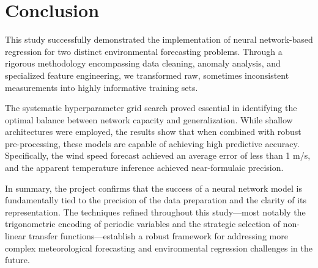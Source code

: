 \documentclass[conference]{IEEEtran}
\begin{document}
\section{Conclusion}
This study successfully demonstrated the implementation of neural network-based regression for two distinct environmental forecasting problems. Through a rigorous methodology encompassing data cleaning, anomaly analysis, and specialized feature engineering, we transformed raw, sometimes inconsistent measurements into highly informative training sets.

The systematic hyperparameter grid search proved essential in identifying the optimal balance between network capacity and generalization. While shallow architectures were employed, the results show that when combined with robust pre-processing, these models are capable of achieving high predictive accuracy. Specifically, the wind speed forecast achieved an average error of less than 1 m/s, and the apparent temperature inference achieved near-formulaic precision.

In summary, the project confirms that the success of a neural network model is fundamentally tied to the precision of the data preparation and the clarity of its representation. The techniques refined throughout this study—most notably the trigonometric encoding of periodic variables and the strategic selection of non-linear transfer functions—establish a robust framework for addressing more complex meteorological forecasting and environmental regression challenges in the future.



\onecolumn
\appendix


\begin{lstlisting}[language=Matlab, caption={windspeed\_data\_cleaning.m}, captionpos=t]

\end{lstlisting}


\begin{lstlisting}[language=Matlab, caption={windspeed\_data\_visualization.m}, captionpos=t]

\end{lstlisting}


\begin{lstlisting}[language=Matlab, caption={windspeed\_model\_training.m}, captionpos=t]

\end{lstlisting}


\begin{lstlisting}[language=Matlab, caption={weatherStation\_model\_training.m}, captionpos=t]

\end{lstlisting}
\end{document}
